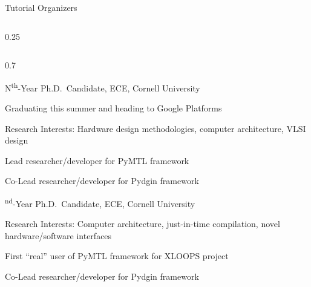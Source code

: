 \begin{frame}{Tutorial Organizers}
\begin{cbxcols}

  \begin{column}{0.25\tw}


    \medskip

  \end{column}

  \begin{column}{0.7\tw}
  \cbxlistfontsize{\footnotesize}{\footnotesize}


  \vspace{0.1in}\hspace*{0.5em}%
  \begin{cbxlist}[t]

    \1 N\textsuperscript{th}-Year Ph.D.~Candidate, ECE, Cornell University

    \vspace{0.02in}
    \1 Graduating this summer and heading to Google Platforms

    \vspace{0.02in}
    \1 Research Interests: Hardware design methodologies, computer
       architecture, VLSI design

    \vspace{0.02in}
    \1 Lead researcher/developer for PyMTL framework

    \vspace{0.02in}
    \1 Co-Lead researcher/developer for Pydgin framework

  \end{cbxlist}

  \medskip

  \vspace{0.1in}\hspace*{0.5em}%
  \begin{cbxlist}[t]

    \textsuperscript{nd}-Year Ph.D.~Candidate, ECE, Cornell University

    \vspace{0.02in}
    \1 Research Interests: Computer architecture, just-in-time
          compilation, novel hardware/software interfaces

    \vspace{0.02in}
    \1 First ``real'' user of PyMTL framework for XLOOPS project

    \vspace{0.02in}
    \1 Co-Lead researcher/developer for Pydgin framework

  \end{cbxlist}

  \cbxlistfontsizereset{}
  \end{column}

\end{cbxcols}
\end{frame}


